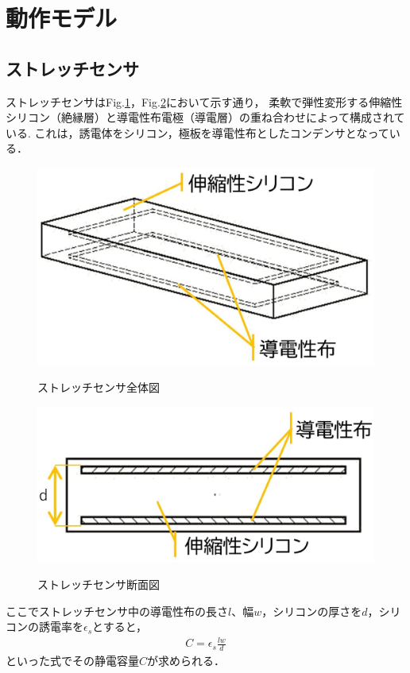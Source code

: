 \section{動作モデル}
\subsection{ストレッチセンサ}
ストレッチセンサはFig.\ref{fig:ストレッチセンサ全体図}，Fig.\ref{fig:ストレッチセンサ断面図}において示す通り，
柔軟で弾性変形する伸縮性シリコン（絶縁層）と導電性布電極（導電層）の重ね合わせによって構成されている.
これは，誘電体をシリコン，極板を導電性布としたコンデンサとなっている．

\begin{figure}[h]
    \begin{center}
        \label{fig:ストレッチセンサ全体図}
        \includegraphics[width=0.5\columnwidth,clip]{./2_measurement/slide1.eps}
        \caption{ストレッチセンサ全体図}
    \end{center}
\end{figure}
\begin{figure}[h]
    \begin{center}       
        \label{fig:ストレッチセンサ断面図}
        \includegraphics[width=0.5\columnwidth,clip]{./2_measurement/slide2.eps}
        \caption{ストレッチセンサ断面図}
    \end{center}
\end{figure}

ここでストレッチセンサ中の導電性布の長さ$l$、幅$w$，シリコンの厚さを$d$，シリコンの誘電率を$\epsilon{}_s$とすると，
\begin{eqnarray}
    C=\epsilon{}_s\frac{lw}{d}
    \label{eq:cap}
\end{eqnarray}
といった式でその静電容量$C$が求められる．


